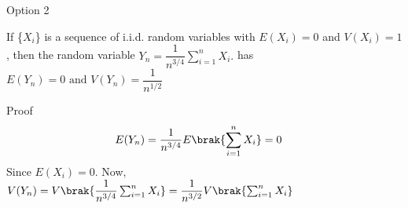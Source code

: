 \documentclass{beamer}
\begin{document}
\begin{frame}{Option 2}
\begin{lemma} \label{result2}
   If \{$X_i$\} is a sequence of i.i.d. random variables with $E(X_i)=0$ and $V(X_i)=1$, then the random variable \begin{math} Y_n=\dfrac{1}{n^{3/4}}\sum_{i=1}^n X_i.\end{math} has \begin{math} E(Y_n) = 0 \text{ and } V(Y_n) = \dfrac{1}{n^{1/2}} \end{math}
\end{lemma}

\begin{block}{Proof}
\begin{align}
    E(Y_n) &= \dfrac{1}{n^{3/4}}E\brak{\sum_{i=1}^n X_i} = 0
\end{align}
Since $E(X_i) = 0$. Now,
\begin{math}
    V(Y_n) = V\brak{\dfrac{1}{n^{3/4}}\sum_{i=1}^n X_i} = \dfrac{1}{n^{3/2}} V\brak{\sum_{i=1}^n X_i}
\end{math}
\end{block}

\end{frame}
\end{document}
